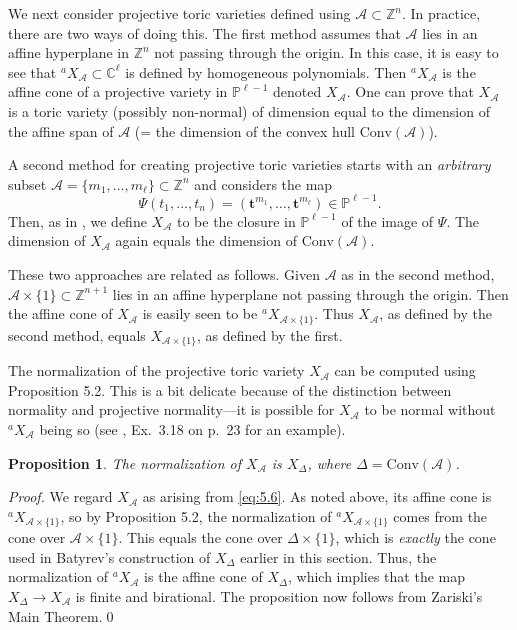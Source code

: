 \documentclass{amsart}
\theoremstyle{plain}
\newtheorem{proposition}[theorem]{Proposition}
\theoremstyle{definition}
\begin{document}
	We next consider projective toric varieties defined using
$\mathcal{A} \subset \mathbb{Z}^n$.  In practice, there are two ways of
doing this.  The first method assumes that $\mathcal{A}$ lies in an affine
hyperplane in $\mathbb{Z}^n$ not passing through the origin.  In this
case, it is easy to see that ${}^a\!X_{\mathcal{A}} \subset \mathbb{C}^\ell$
is defined by homogeneous polynomials.  Then ${}^a\!X_{\mathcal{A}}$ is
the affine cone of a projective variety in $\mathbb{P}^{\ell-1}$ denoted
$X_{\mathcal{A}}$.  One can prove that $X_{\mathcal{A}}$ is a toric variety
(possibly non-normal) of dimension equal to the dimension of the
affine span of $\mathcal{A}$ (= the dimension of the convex hull
$\mathrm{Conv}(\mathcal{A})$).

	A second method for creating projective toric varieties starts
with an {\it arbitrary\/} subset $\mathcal{A} = \{m_1,\dots,m_\ell\}
\subset \mathbb{Z}^n$ and considers the map
\begin{equation}
\Psi(t_1,\dots,t_n) = (\mathbf{t}^{m_1},\dots,\mathbf{t}^{m_\ell}) \in
\mathbb{P}^{\ell-1} .
\tag{5.6}\label{eq:5.6}
\end{equation}
Then, as in \cite{GKZ1}, we define $X_{\mathcal{A}}$ to be the closure in
$\mathbb{P}^{\ell-1}$ of the image of $\Psi$.  The dimension of
$X_{\mathcal{A}}$ again equals the dimension of $\mathrm{Conv}(\mathcal{A})$.

	These two approaches are related as follows.  Given $\mathcal{A}$
as in the second method, $\mathcal{A}\times\{1\} \subset \mathbb{Z}^{n+1}$
lies in an affine hyperplane not passing through the origin.  Then the
affine cone of $X_{\mathcal{A}}$ is easily seen to be
${}^a\!X_{\mathcal{A}\times\{1\}}$.  Thus $X_{\mathcal{A}}$, as defined by the
second method, equals $X_{\mathcal{A}\times\{1\}}$, as  defined by the first.

	The normalization of the projective toric variety
$X_{\mathcal{A}}$ can be computed using Proposition 5.2.  This is a bit
delicate because of the distinction between normality and projective
normality---it is possible for $X_{\mathcal{A}}$ to be normal without
${}^a\!X_{\mathcal{A}}$ being so (see \cite{Har}, Ex.~3.18 on p.~23 for an example).

\begin{proposition} The normalization of $X_{\mathcal{A}}$ is
$X_\Delta$, where $\Delta = \mathrm{Conv}(\mathcal{A})$. 
\end{proposition}

\begin{proof} We regard $X_{\mathcal{A}}$ as arising from \eqref{eq:5.6}.  As
noted above, its affine cone is ${}^a\!X_{\mathcal{A}\times\{1\}}$, so by
Proposition 5.2, the normalization of ${}^a\!X_{\mathcal{A}\times\{1\}}$
comes from the cone over $\mathcal{A}\times\{1\}$.  This equals the cone
over $\Delta\times\{1\}$, which is {\it exactly\/} the cone used in
Batyrev's construction of $X_\Delta$ earlier in this section.  Thus,
the normalization of ${}^a\!X_{\mathcal{A}}$ is the affine cone of
$X_\Delta$, which implies that the map $X_\Delta \to X_{\mathcal{A}}$ is
finite and birational.  The proposition now follows from Zariski's
Main Theorem.\qed
\end{proof}
\end{document}
